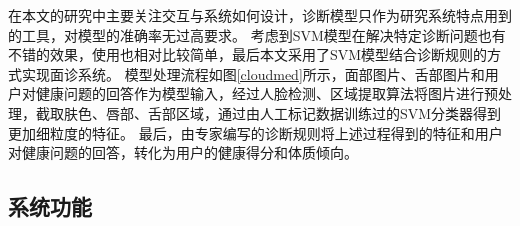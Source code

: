 在本文的研究中主要关注交互与系统如何设计，诊断模型只作为研究系统特点用到的工具，对模型的准确率无过高要求。
考虑到SVM模型在解决特定诊断问题也有不错的效果，使用也相对比较简单，最后本文采用了SVM模型结合诊断规则的方式实现面诊系统。
模型处理流程如图\ref{cloudmed}所示，面部图片、舌部图片和用户对健康问题的回答作为模型输入，经过人脸检测、区域提取算法将图片进行预处理，截取肤色、唇部、舌部区域，通过由人工标记数据训练过的SVM分类器得到更加细粒度的特征。
最后，由专家编写的诊断规则将上述过程得到的特征和用户对健康问题的回答，转化为用户的健康得分和体质倾向。 


\subsection{系统功能}


